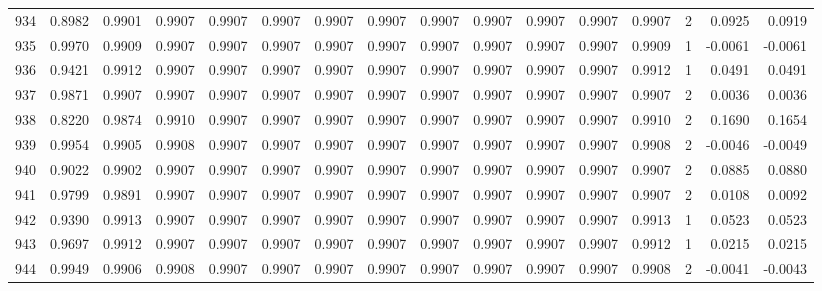 \begin{tabular}{lrrrrrrrrrrrrrrr}
934 &      0.8982 &  0.9901 &  0.9907 &  0.9907 &  0.9907 &  0.9907 &  0.9907 &  0.9907 &  0.9907 &  0.9907 &   0.9907 &     0.9907 &      2 &                    0.0925 &                     0.0919 \\
935 &      0.9970 &  0.9909 &  0.9907 &  0.9907 &  0.9907 &  0.9907 &  0.9907 &  0.9907 &  0.9907 &  0.9907 &   0.9907 &     0.9909 &      1 &                   -0.0061 &                    -0.0061 \\
936 &      0.9421 &  0.9912 &  0.9907 &  0.9907 &  0.9907 &  0.9907 &  0.9907 &  0.9907 &  0.9907 &  0.9907 &   0.9907 &     0.9912 &      1 &                    0.0491 &                     0.0491 \\
937 &      0.9871 &  0.9907 &  0.9907 &  0.9907 &  0.9907 &  0.9907 &  0.9907 &  0.9907 &  0.9907 &  0.9907 &   0.9907 &     0.9907 &      2 &                    0.0036 &                     0.0036 \\
938 &      0.8220 &  0.9874 &  0.9910 &  0.9907 &  0.9907 &  0.9907 &  0.9907 &  0.9907 &  0.9907 &  0.9907 &   0.9907 &     0.9910 &      2 &                    0.1690 &                     0.1654 \\
939 &      0.9954 &  0.9905 &  0.9908 &  0.9907 &  0.9907 &  0.9907 &  0.9907 &  0.9907 &  0.9907 &  0.9907 &   0.9907 &     0.9908 &      2 &                   -0.0046 &                    -0.0049 \\
940 &      0.9022 &  0.9902 &  0.9907 &  0.9907 &  0.9907 &  0.9907 &  0.9907 &  0.9907 &  0.9907 &  0.9907 &   0.9907 &     0.9907 &      2 &                    0.0885 &                     0.0880 \\
941 &      0.9799 &  0.9891 &  0.9907 &  0.9907 &  0.9907 &  0.9907 &  0.9907 &  0.9907 &  0.9907 &  0.9907 &   0.9907 &     0.9907 &      2 &                    0.0108 &                     0.0092 \\
942 &      0.9390 &  0.9913 &  0.9907 &  0.9907 &  0.9907 &  0.9907 &  0.9907 &  0.9907 &  0.9907 &  0.9907 &   0.9907 &     0.9913 &      1 &                    0.0523 &                     0.0523 \\
943 &      0.9697 &  0.9912 &  0.9907 &  0.9907 &  0.9907 &  0.9907 &  0.9907 &  0.9907 &  0.9907 &  0.9907 &   0.9907 &     0.9912 &      1 &                    0.0215 &                     0.0215 \\
944 &      0.9949 &  0.9906 &  0.9908 &  0.9907 &  0.9907 &  0.9907 &  0.9907 &  0.9907 &  0.9907 &  0.9907 &   0.9907 &     0.9908 &      2 &                   -0.0041 &                    -0.0043 \\

\end{tabular}
